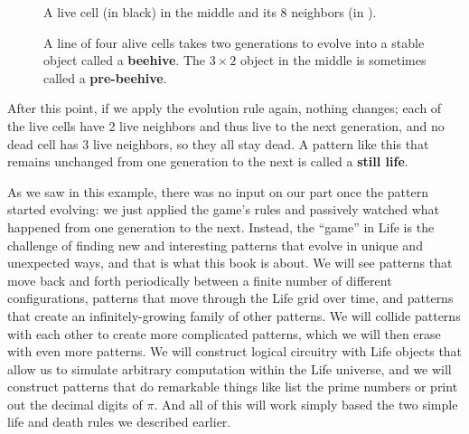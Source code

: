 \begin{figure}[!htb]
	\centering
	\begin{minipage}[b]{0.38\textwidth}
		\centering
		\caption{A live cell (in black) in the middle and its 8 neighbors (in ).}\label{fig:neighborhood}
	\end{minipage}\hfill
	\begin{minipage}[b]{0.58\textwidth}
		\centering
		\caption{A line of four alive cells takes two generations to evolve into a stable object called a \textbf{beehive}. The $3 \times 2$ object in the middle is sometimes called a \textbf{pre-beehive}.}\label{fig:first_example}
	\end{minipage}
\end{figure}

After this point, if we apply the evolution rule again, nothing changes; each of the live cells have 2 live neighbors and thus live to the next generation, and no dead cell has 3 live neighbors, so they all stay dead. A pattern like this that remains unchanged from one generation to the next is called a \textbf{still life}.

As we saw in this example, there was no input on our part once the pattern started evolving: we just applied the game's rules and passively watched what happened from one generation to the next. Instead, the ``game'' in Life is the challenge of finding new and interesting patterns that evolve in unique and unexpected ways, and that is what this book is about. We will see patterns that move back and forth periodically between a finite number of different configurations, patterns that move through the Life grid over time, and patterns that create an infinitely-growing family of other patterns. We will collide patterns with each other to create more complicated patterns, which we will then erase with even more patterns. We will construct logical circuitry with Life objects that allow us to simulate arbitrary computation within the Life universe, and we will construct patterns that do remarkable things like list the prime numbers or print out the decimal digits of $\pi$. And all of this will work simply based the two simple life and death rules we described earlier.

